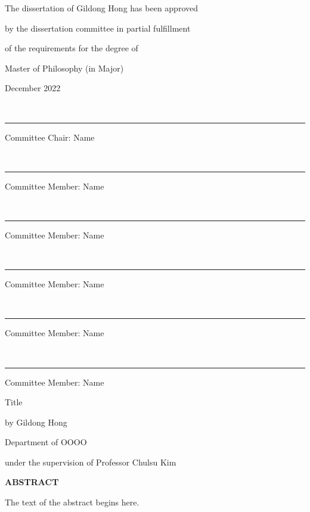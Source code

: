 \documentclass[11pt]{report}
\theoremstyle{plain}
\theoremstyle{definition}
\theoremstyle{corollary}
\theoremstyle{definition}
\theoremstyle{plain}
\theoremstyle{definition}
\theoremstyle{plain}
\begin{document}
\newpage
\begin{center}
\Large
The dissertation of Gildong Hong has been approved \par
by the dissertation committee in partial fulfillment\par
of the requirements for the degree of \par
Master of Philosophy (in Major) 
\par\vspace{50pt}
\large December 2022
\par\vspace{50pt}
{\small\color{gray}{student signiture}}\\[-10pt]\rule{.6\textwidth}{0.4pt}\par
Committee Chair: Name
\par\vspace{20pt}
{\small\color{gray}{student signiture}}\\[-10pt]\rule{.6\textwidth}{0.4pt}\par
Committee Member: Name
\par\vspace{20pt}
{\small\color{gray}{student signiture}}\\[-10pt]\rule{.6\textwidth}{0.4pt}\par
Committee Member: Name 
\par\vspace{20pt}
{\small\color{gray}{student signiture}}\\[-10pt]\rule{.6\textwidth}{0.4pt}\par
Committee Member: Name 
\par\vspace{20pt}
{\small\color{gray}{student signiture}}\\[-10pt]\rule{.6\textwidth}{0.4pt}\par
Committee Member: Name 
\par\vspace{20pt}
{\small\color{gray}{student signiture}}\\[-10pt]\rule{.6\textwidth}{0.4pt}\par
Committee Member: Name 
\end{center}

\newpage
{}


\newpage
\begin{center}
\LARGE Title
\par\vspace{20pt}
\normalsize by Gildong Hong\par
Department of OOOO\par
under the supervision of Professor Chulsu Kim

\par\vspace{20pt}

\large \textbf{ABSTRACT}
\end{center}
\normalsize
The text of the abstract begins here. 
\end{document}
